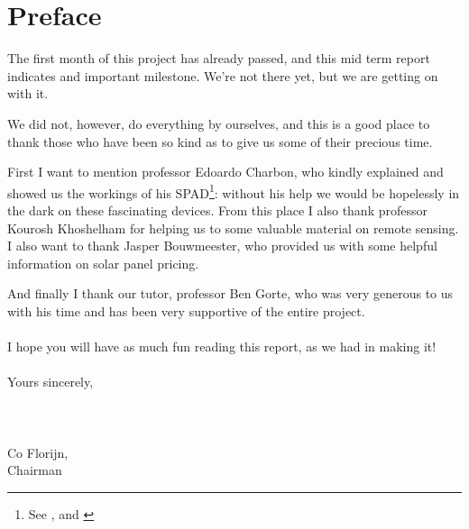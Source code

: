 \chapter*{Preface}

The first month of this project has already passed, and this mid term report indicates and important milestone. We're not there yet, but we are getting on with it.

We did not, however, do everything by ourselves, and this is a good place to thank those who have been so kind as to give us some of their precious time.

First I want to mention professor Edoardo Charbon, who kindly explained and showed us the workings of his \ac{SPAD}\footnote{See \cite[98-105]{SPADThesis}, \cite{SPAD2} and \cite{SPAD3}}: without his help we would be hopelessly in the dark on these fascinating devices. From this place I also thank professor Kourosh Khoshelham for helping us to some valuable material on remote sensing. I also want to thank Jasper Bouwmeester, who provided us with some helpful information on solar panel pricing.

And finally I thank our tutor, professor Ben Gorte, who was very generous to us with his time and has been very supportive of the entire project.\\\\
I hope you will have as much fun reading this report, as we had in making it!\\\\
Yours sincerely,\\\\\\\\
 \hspace{2cm}Co Florijn,\\
 \hspace{2cm}Chairman